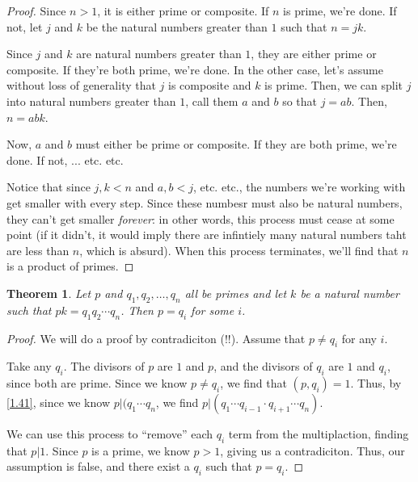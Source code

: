 \documentclass{article}
\newtheorem{thm}{Theorem}[section]
\numberwithin{equation}{thm}
\begin{document}
 \begin{proof}
   Since $n > 1$, it is either prime or composite. If $n$ is prime, we're done. If not, let $j$ and $k$ be the natural numbers greater than $1$ such that $n = jk$.

   Since $j$ and $k$ are natural numbers greater than $1$, they are either prime or composite. If they're both prime, we're done. In the other case, let's assume without loss of generality that $j$ is composite and $k$ is prime. Then, we can split $j$ into natural numbers greater than $1$, call them $a$ and $b$ so that $j = ab$. Then, $n = abk$.

   Now, $a$ and $b$ must either be prime or composite. If they are both prime, we're done. If not, ... etc. etc.

   Notice that since $j, k < n$ and $a, b < j$, etc. etc., the numbers we're working with get smaller with every step. Since these numbesr must also be natural numbers, they can't get smaller \emph{forever}: in other words, this process must cease at some point (if it didn't, it would imply there are infintiely many natural numbers taht are less than $n$, which is absurd). When this process terminates, we'll find that $n$ is a product of primes.
 \end{proof}



\begin{thm} \label{2.8}
  Let $p$ and $q_1, q_2, \ldots, q_n$ all be primes and let $k$ be a natural number such that $pk = q_1 q_2 \cdots q_n$. Then $p = q_i$ for some $i$.
\end{thm}

\begin{proof}
  We will do a proof by contradiciton (!!). Assume that $p \neq q_i$ for any $i$.

  Take any $q_i$. The divisors of $p$ are $1$ and $p$, and the divisors of $q_i$ are $1$ and $q_i$, since both are prime. Since we know $p \neq q_i$, we find that $(p, q_i) = 1$. Thus, by \ref{1.41}, since we know $p | (q_1 \cdots q_n$, we find $p | (q_1 \cdots q_{i-1} \cdot q_{i+1} \cdots q_n)$.

  We can use this process to ``remove'' each $q_i$ term from the multiplaction, finding that $p | 1$. Since $p$ is a prime, we know $p > 1$, giving us a contradiciton. Thus, our assumption is false, and there exist a $q_i$ such that $p = q_i$.
\end{proof}
\end{document}
